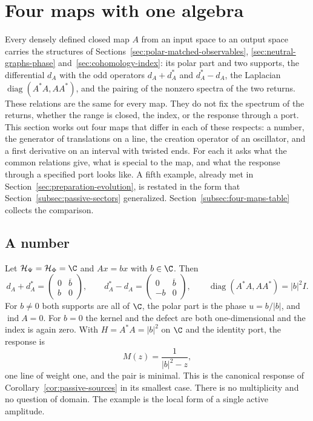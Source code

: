 \section{Four maps with one algebra}
\label{sec:four-maps}

Every densely defined closed map $A$ from an input space to an output space carries the structures of Sections~\ref{sec:polar-matched-observables}, \ref{sec:neutral-graphs-phase} and~\ref{sec:cohomology-index}: its polar part and two supports, the differential $d_A$ with the odd operators $d_A+d_A^*$ and $d_A^*-d_A$, the Laplacian $\operatorname{diag}(A^*A,AA^*)$, and the pairing of the nonzero spectra of the two returns. These relations are the same for every map. They do not fix the spectrum of the returns, whether the range is closed, the index, or the response through a port. This section works out four maps that differ in each of these respects: a number, the generator of translations on a line, the creation operator of an oscillator, and a first derivative on an interval with twisted ends. For each it asks what the common relations give, what is special to the map, and what the response through a specified port looks like. A fifth example, already met in Section~\ref{sec:preparation-evolution}, is restated in the form that Section~\ref{subsec:passive-sectors} generalized. Section~\ref{subsec:four-maps-table} collects the comparison.

\subsection{A number}
\label{subsec:four-maps-scalar}

Let $\mathcal H_\Psi=\mathcal H_\Phi=\C$ and $Ax=bx$ with $b\in\C$. Then
\begin{equation}
 d_A+d_A^*=\begin{pmatrix}0&\overline b\\ b&0\end{pmatrix},\qquad
 d_A^*-d_A=\begin{pmatrix}0&\overline b\\ -b&0\end{pmatrix},\qquad
 \operatorname{diag}(A^*A,AA^*)=|b|^2I .
 \label{eq:four-maps-scalar}
\end{equation}
For $b\ne0$ both supports are all of $\C$, the polar part is the phase $u=b/|b|$, and $\operatorname{ind}A=0$. For $b=0$ the kernel and the defect are both one-dimensional and the index is again zero. With $H=A^*A=|b|^2$ on $\C$ and the identity port, the response is
\begin{equation}
 M(z)=\frac{1}{|b|^2-z},
 \label{eq:four-maps-scalar-response}
\end{equation}
one line of weight one, and the pair is minimal. This is the canonical response of Corollary~\ref{cor:passive-sources} in its smallest case. There is no multiplicity and no question of domain. The example is the local form of a single active amplitude.

